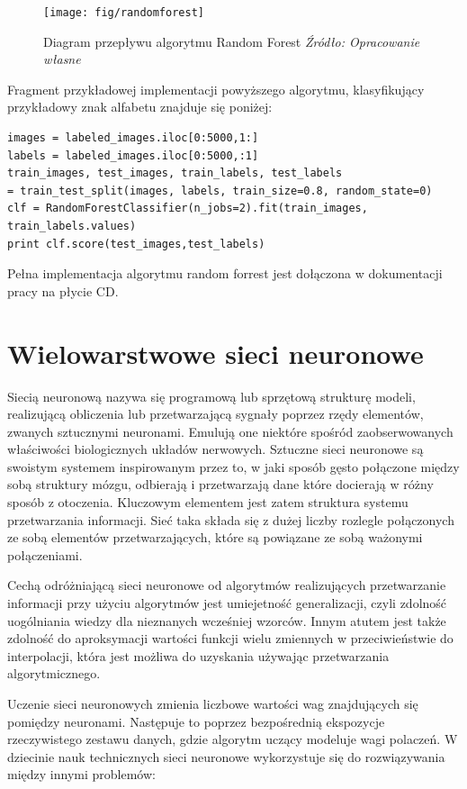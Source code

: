 \documentclass[brudnopis]{xmgr}
\begin{document}
\newpage

\begin{figure}[!tbh]
\centering
\texttt{[image: fig/randomforest]}
\caption{Diagram przepływu algorytmu Random Forest \emph{Źródło: Opracowanie własne}}
\end{figure}

Fragment przykładowej implementacji powyższego algorytmu, klasyfikujący przykładowy znak alfabetu znajduje się poniżej:

\begin{verbatim}
images = labeled_images.iloc[0:5000,1:]
labels = labeled_images.iloc[0:5000,:1]
train_images, test_images, train_labels, test_labels 
= train_test_split(images, labels, train_size=0.8, random_state=0)
clf = RandomForestClassifier(n_jobs=2).fit(train_images, train_labels.values)
print clf.score(test_images,test_labels)
\end{verbatim}

Pełna implementacja algorytmu random forrest jest dołączona w dokumentacji pracy na płycie CD. 

\section{Wielowarstwowe sieci neuronowe}

Siecią neuronową\cite{1}\cite{12} nazywa się programową lub sprzętową strukturę modeli, realizującą obliczenia lub przetwarzającą sygnały poprzez rzędy elementów, zwanych sztucznymi neuronami. Emulują one niektóre spośród zaobserwowanych właściwości biologicznych układów nerwowych. Sztuczne sieci neuronowe są swoistym systemem inspirowanym przez to, w jaki sposób gęsto połączone między sobą struktury mózgu, odbierają i przetwarzają dane które docierają w różny sposób z otoczenia. Kluczowym elementem jest zatem struktura systemu przetwarzania informacji. Sieć taka składa się z dużej liczby rozlegle połączonych ze sobą elementów przetwarzających, które są powiązane ze sobą ważonymi połączeniami.

Cechą odróżniającą sieci neuronowe od algorytmów realizujących przetwarzanie informacji przy użyciu algorytmów jest umiejetność generalizacji, czyli zdolność uogólniania wiedzy dla nieznanych wcześniej wzorców. Innym atutem jest także zdolność do aproksymacji wartości funkcji wielu zmiennych w przeciwieństwie do interpolacji, która jest możliwa do uzyskania używając przetwarzania algorytmicznego.

Uczenie sieci neuronowych zmienia liczbowe wartości wag znajdujących się pomiędzy neuronami. Następuje to poprzez bezpośrednią ekspozycje rzeczywistego zestawu danych, gdzie algorytm uczący modeluje wagi polaczeń. W dziecinie nauk technicznych sieci neuronowe wykorzystuje się do rozwiązywania między innymi problemów:
\end{document}
